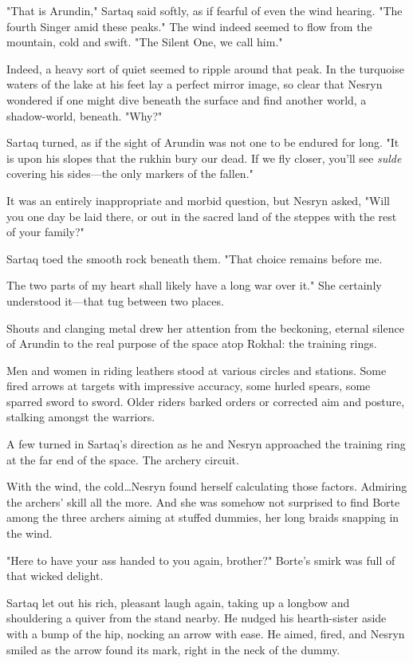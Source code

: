 "That is Arundin," Sartaq said softly, as if fearful of even the wind hearing.
"The fourth Singer amid these peaks."
The wind indeed seemed to flow from the mountain, cold and swift.
"The Silent One, we call him."

Indeed, a heavy sort of quiet seemed to ripple around that peak.
In the turquoise waters of the lake at his feet lay a perfect mirror image, so clear that Nesryn wondered if one might dive beneath the surface and find another world, a shadow-world, beneath.
"Why?"

Sartaq turned, as if the sight of Arundin was not one to be endured for long.
"It is upon his slopes that the rukhin bury our dead.
If we fly closer, you'll see \emph{sulde} covering his sides---the only markers of the fallen."

It was an entirely inappropriate and morbid question, but Nesryn asked, "Will you one day be laid there, or out in the sacred land of the steppes with the rest of your family?"

Sartaq toed the smooth rock beneath them.
"That choice remains before me.

The two parts of my heart shall likely have a long war over it."
She certainly understood it---that tug between two places.

Shouts and clanging metal drew her attention from the beckoning, eternal silence of Arundin to the real purpose of the space atop Rokhal: the training rings.

Men and women in riding leathers stood at various circles and stations.
Some fired arrows at targets with impressive accuracy, some hurled spears, some sparred sword to sword.
Older riders barked orders or corrected aim and posture, stalking amongst the warriors.

A few turned in Sartaq's direction as he and Nesryn approached the training ring at the far end of the space.
The archery circuit.

With the wind, the cold\ldots Nesryn found herself calculating those factors.
Admiring the archers' skill all the more.
And she was somehow not surprised to find Borte among the three archers aiming at stuffed dummies, her long braids snapping in the wind.

"Here to have your ass handed to you again, brother?"
Borte's smirk was full of that wicked delight.

Sartaq let out his rich, pleasant laugh again, taking up a longbow and shouldering a quiver from the stand nearby.
He nudged his hearth-sister aside with a bump of the hip, nocking an arrow with ease.
He aimed, fired, and Nesryn smiled as the arrow found its mark, right in the neck of the dummy.

